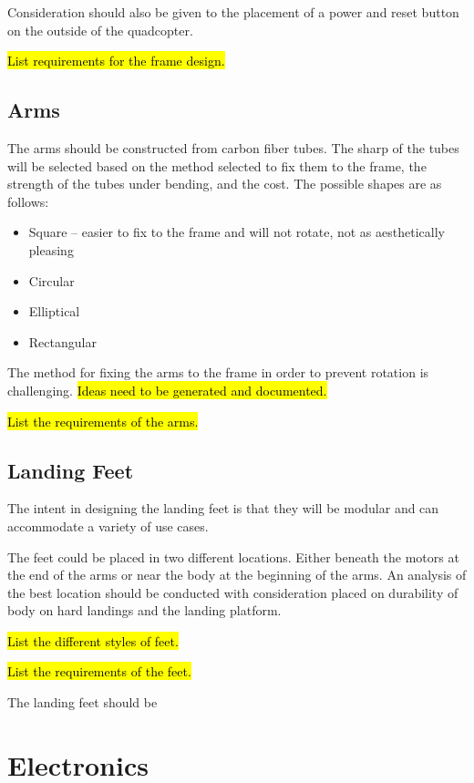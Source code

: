 Consideration should also be given to the placement of a power and reset button on the outside of the quadcopter.

\hl{List requirements for the frame design.}

\subsection{Arms}
The arms should be constructed from carbon fiber tubes. The sharp of the tubes will be selected based on the method selected to fix them to the frame, the strength of the tubes under bending, and the cost. The possible shapes are as follows:

\begin{itemize}
	\setlength{\itemsep}{0pt}%
	\setlength{\parskip}{-6pt}%
	\item Square – easier to fix to the frame and will not rotate, not as aesthetically pleasing
	\item Circular 
	\item Elliptical 
	\item Rectangular
\end{itemize}

The method for fixing the arms to the frame in order to prevent rotation is challenging. \hl{Ideas need to be generated and documented. }

\hl{List the requirements of the arms.}

\subsection{Landing Feet}
The intent in designing the landing feet is that they will be modular and can accommodate a variety of use cases. 

The feet could be placed in two different locations. Either beneath the motors at the end of the arms or near the body at the beginning of the arms. An analysis of the best location should be conducted with consideration placed on durability of body on hard landings and the landing platform.

\hl{List the different styles of feet.}

\hl{List the requirements of the feet.}

The landing feet should be 

\section{Electronics}

